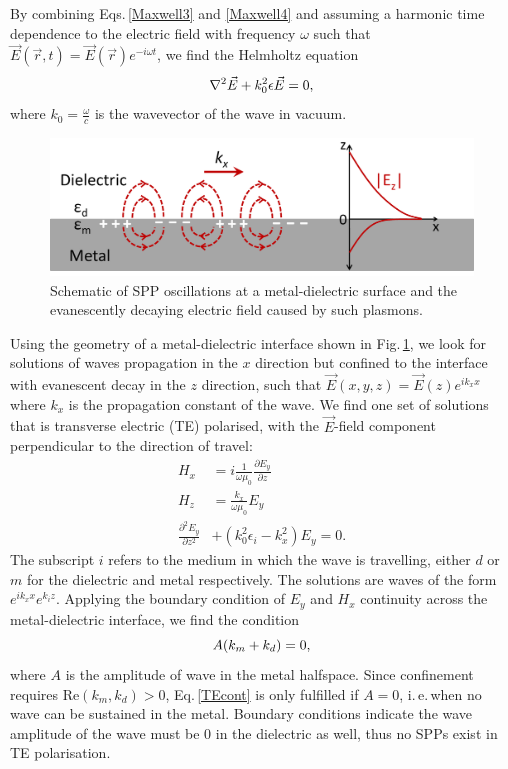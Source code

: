 By combining Eqs.\,\ref{Maxwell3} and \ref{Maxwell4} and assuming a harmonic time dependence to the electric field with frequency $\omega$ such that $\vec{E}(\vec{r},t) = \vec{E}(\vec{r})e^{-i\omega t}$, we find the Helmholtz equation
\begin{equation}
\centering
\nabla^2\vec{E} + k_0^2\epsilon \vec{E} = 0,
\label{Helmholz}
\end{equation}
where $k_0 = \frac{\omega}{c}$ is the wavevector of the wave in vacuum.
\begin{figure}[h!] 
\centering    
\includegraphics[width=\textwidth]{Fig1}
\caption{Schematic of SPP oscillations at a metal-dielectric surface and the evanescently decaying electric field caused by such plasmons.}
\label{3Fig1}
\end{figure}

Using the geometry of a metal-dielectric interface shown in Fig.\,\ref{3Fig1}, we look for solutions of waves propagation in the $x$ direction but confined to the interface with evanescent decay in the $z$ direction, such that $\vec{E}(x,y,z)=\vec{E}(z) e^{i k_x x}$ where $k_x$ is the propagation constant of the wave. We find one set of solutions that is transverse electric (TE) polarised, with the $\vec{E}$-field component perpendicular to the direction of travel:
\begin{subequations}
\label{TEplasmons}
\begin{align}
H_x &= i \frac{1}{\omega \mu_0} \frac{\partial E_y}{\partial z}\\
H_z &= \frac{k_x}{\omega \mu_0} E_y\\
\frac{\partial^2 E_y}{\partial z^2} &+ (k_0^2 \epsilon_i-k_x^2)E_y = 0 .
\end{align}
\end{subequations}
The subscript $i$ refers to the medium in which the wave is travelling, either $d$ or $m$ for the dielectric and metal respectively. The solutions are waves of the form $e^{i k_x x} e^{k_i z}$. Applying the boundary condition of $E_y$ and $H_x$ continuity across the metal-dielectric interface, we find the condition 
\begin{equation}
\centering
A(k_m+k_d)=0 ,
\label{TEcont}
\end{equation}
where $A$ is the amplitude of wave in the metal halfspace. Since confinement requires Re$(k_m, k_d)>0$, Eq.\,\ref{TEcont} is only fulfilled if $A=0$, i.\,e.\,when no wave can be sustained in the metal. Boundary conditions indicate the wave amplitude of the wave must be 0 in the dielectric as well, thus no SPPs exist in TE polarisation.

